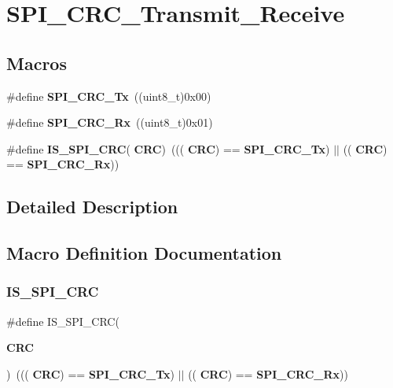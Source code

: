 \section{S\+P\+I\+\_\+\+C\+R\+C\+\_\+\+Transmit\+\_\+\+Receive}
\label{group__SPI__CRC__Transmit__Receive}
\subsection*{Macros}
\begin{DoxyCompactItemize}
\item 
\#define \textbf{ S\+P\+I\+\_\+\+C\+R\+C\+\_\+\+Tx}~((uint8\+\_\+t)0x00)
\item 
\#define \textbf{ S\+P\+I\+\_\+\+C\+R\+C\+\_\+\+Rx}~((uint8\+\_\+t)0x01)
\item 
\#define \textbf{ I\+S\+\_\+\+S\+P\+I\+\_\+\+C\+RC}(\textbf{ C\+RC})~(((\textbf{ C\+RC}) == \textbf{ S\+P\+I\+\_\+\+C\+R\+C\+\_\+\+Tx}) $\vert$$\vert$ ((\textbf{ C\+RC}) == \textbf{ S\+P\+I\+\_\+\+C\+R\+C\+\_\+\+Rx}))
\end{DoxyCompactItemize}


\subsection{Detailed Description}


\subsection{Macro Definition Documentation}
\mbox{\label{group__SPI__CRC__Transmit__Receive_ga31fe242594f851558496a93f85def883}} 
\subsubsection{I\+S\+\_\+\+S\+P\+I\+\_\+\+C\+RC}
{\footnotesize\ttfamily \#define I\+S\+\_\+\+S\+P\+I\+\_\+\+C\+RC(\begin{DoxyParamCaption}\item[{}]{\textbf{ C\+RC} }\end{DoxyParamCaption})~(((\textbf{ C\+RC}) == \textbf{ S\+P\+I\+\_\+\+C\+R\+C\+\_\+\+Tx}) $\vert$$\vert$ ((\textbf{ C\+RC}) == \textbf{ S\+P\+I\+\_\+\+C\+R\+C\+\_\+\+Rx}))}



